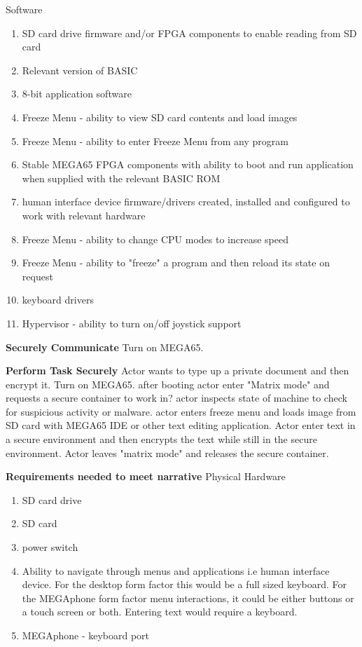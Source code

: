 Software
\begin{enumerate}
\item SD card drive firmware and/or FPGA components to enable reading from SD card
\item Relevant version of BASIC 
\item 8-bit application software
\item Freeze Menu - ability to view SD card contents and load images
\item Freeze Menu - ability to enter Freeze Menu from any program
\item Stable MEGA65 FPGA components with ability to boot and run application when supplied with the relevant BASIC ROM
\item human interface device firmware/drivers created, installed and configured to work with relevant hardware
\item Freeze Menu - ability to change CPU modes to increase speed
\item Freeze Menu - ability to "freeze" a program and then reload its state on request
\item keyboard drivers
\item Hypervisor - ability to turn on/off joystick support
\end{enumerate}

\textbf{Securely Communicate}
Turn on MEGA65.

\textbf{Perform Task Securely}
Actor wants to type up a private document and then encrypt it. Turn on MEGA65. after booting actor enter "Matrix mode" and requests a secure container to work in? actor inspects state of machine to check for suspicious activity or malware. 
actor enters freeze menu and loads image from SD card with MEGA65 IDE or other text editing application. Actor enter text in a secure environment and then encrypts the text while still in the secure environment. Actor leaves "matrix mode" and releases the secure container.

\textbf{Requirements needed to meet narrative}
Physical Hardware
\begin{enumerate}
\item SD card drive
\item SD card
\item power switch
\item Ability to navigate through menus and applications i.e human interface device. For the desktop form factor this would be a full sized keyboard. For the MEGAphone form factor menu interactions, it could be either buttons or a touch screen or both. Entering text would require a keyboard.
\item MEGAphone - keyboard port
\end{enumerate}

